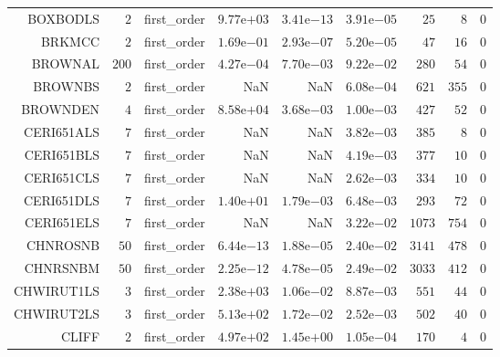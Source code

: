 \begin{longtable}{rrrrrrrrr}
BOXBODLS & \(     2\) & first\_order & \( 9.77\)e\(+03\) & \( 3.41\)e\(-13\) & \( 3.91\)e\(-05\) & \(    25\) & \(     8\) & \(     0\) \\
BRKMCC & \(     2\) & first\_order & \( 1.69\)e\(-01\) & \( 2.93\)e\(-07\) & \( 5.20\)e\(-05\) & \(    47\) & \(    16\) & \(     0\) \\
BROWNAL & \(   200\) & first\_order & \( 4.27\)e\(-04\) & \( 7.70\)e\(-03\) & \( 9.22\)e\(-02\) & \(   280\) & \(    54\) & \(     0\) \\
BROWNBS & \(     2\) & first\_order &       NaN &       NaN & \( 6.08\)e\(-04\) & \(   621\) & \(   355\) & \(     0\) \\
BROWNDEN & \(     4\) & first\_order & \( 8.58\)e\(+04\) & \( 3.68\)e\(-03\) & \( 1.00\)e\(-03\) & \(   427\) & \(    52\) & \(     0\) \\
CERI651ALS & \(     7\) & first\_order &       NaN &       NaN & \( 3.82\)e\(-03\) & \(   385\) & \(     8\) & \(     0\) \\
CERI651BLS & \(     7\) & first\_order &       NaN &       NaN & \( 4.19\)e\(-03\) & \(   377\) & \(    10\) & \(     0\) \\
CERI651CLS & \(     7\) & first\_order &       NaN &       NaN & \( 2.62\)e\(-03\) & \(   334\) & \(    10\) & \(     0\) \\
CERI651DLS & \(     7\) & first\_order & \( 1.40\)e\(+01\) & \( 1.79\)e\(-03\) & \( 6.48\)e\(-03\) & \(   293\) & \(    72\) & \(     0\) \\
CERI651ELS & \(     7\) & first\_order &       NaN &       NaN & \( 3.22\)e\(-02\) & \(  1073\) & \(   754\) & \(     0\) \\
CHNROSNB & \(    50\) & first\_order & \( 6.44\)e\(-13\) & \( 1.88\)e\(-05\) & \( 2.40\)e\(-02\) & \(  3141\) & \(   478\) & \(     0\) \\
CHNRSNBM & \(    50\) & first\_order & \( 2.25\)e\(-12\) & \( 4.78\)e\(-05\) & \( 2.49\)e\(-02\) & \(  3033\) & \(   412\) & \(     0\) \\
CHWIRUT1LS & \(     3\) & first\_order & \( 2.38\)e\(+03\) & \( 1.06\)e\(-02\) & \( 8.87\)e\(-03\) & \(   551\) & \(    44\) & \(     0\) \\
CHWIRUT2LS & \(     3\) & first\_order & \( 5.13\)e\(+02\) & \( 1.72\)e\(-02\) & \( 2.52\)e\(-03\) & \(   502\) & \(    40\) & \(     0\) \\
CLIFF & \(     2\) & first\_order & \( 4.97\)e\(+02\) & \( 1.45\)e\(+00\) & \( 1.05\)e\(-04\) & \(   170\) & \(     4\) & \(     0\) \\

\end{longtable}
